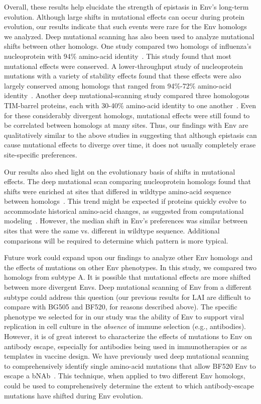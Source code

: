 \documentclass[9pt]{elife}
\begin{document}
Overall, these results help elucidate the strength of epistasis in Env's long-term evolution.
Although large shifts in mutational effects can occur during protein evolution, our results indicate that such events were rare for the Env homologs we analyzed.
Deep mutational scanning has also been used to analyze mutational shifts between other homologs.
One study compared two homologs of influenza's nucleoprotein with 94\% amino-acid identity~\cite{doud2015site}.
This study found that most mutational effects were conserved.
A lower-throughput study of nucleoprotein mutations with a variety of stability effects found that these effects were also largely conserved among homologs that ranged from 94\%-72\% amino-acid identity~\cite{ashenberg2013mutational}.
Another deep mutational-scanning study compared three homologous TIM-barrel proteins, each with 30-40\% amino-acid identity to one another~\cite{chan2017correlation}.
Even for these considerably divergent homologs, mutational effects were still found to be correlated between homologs at many sites.
Thus, our findings with Env are qualitatively similar to the above studies in suggesting that although epistasis can cause mutational effects to diverge over time, it does not usually completely erase site-specific preferences.

Our results also shed light on the evolutionary basis of shifts in mutational effects.
The deep mutational scan comparing nucleoprotein homologs found that shifts were enriched at sites that differed in wildtype amino-acid sequence between homologs~\cite{doud2015site}.
This trend might be expected if proteins quickly evolve to accommodate historical amino-acid changes, as suggested from computational modeling~\cite{pollock2012amino}.
However, the median shift in Env's preferences was similar between sites that were the same vs. different in wildtype sequence.
Additional comparisons will be required to determine which pattern is more typical.

Future work could expand upon our findings to analyze other Env homologs and the effects of mutations on other Env phenotypes.
In this study, we compared two homologs from subtype A.
It is possible that mutational effects are more shifted between more divergent Envs.
Deep mutational scanning of Env from a different subtype could address this question (our previous results for LAI are difficult to compare with BG505 and BF520, for reasons described above).
The specific phenotype we selected for in our study was the ability of Env to support viral replication in cell culture in the \textit{absence} of immune selection (e.g., antibodies).
However, it is of great interest to characterize the effects of mutations to Env on antibody escape, especially for antibodies being used in immunotherapies or as templates in vaccine design.
We have previously used deep mutational scanning to comprehensively identify single amino-acid mutations that allow BF520 Env to escape a bNAb~\cite{dingens2017comprehensive}.
This technique, when applied to two different Env homologs, could be used to comprehensively determine the extent to which antibody-escape mutations have shifted during Env evolution.
\end{document}
